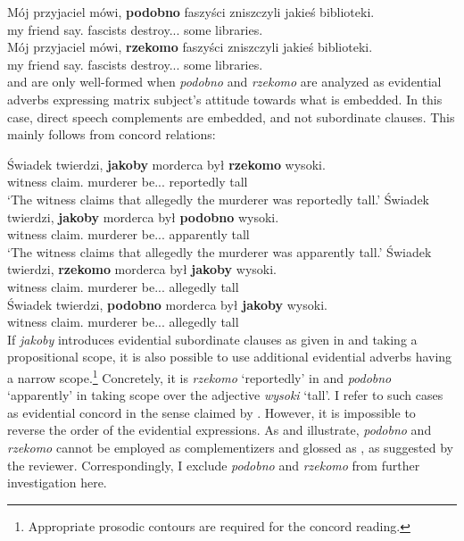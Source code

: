 \documentclass[output=paper
,modfonts
,nonflat]{langsci/langscibook}
\begin{document}
\ea \ea \gll	*Mój przyjaciel mówi, \textbf{podobno} faszyści zniszczyli jakieś biblioteki.  \label{podobno} \\
		my friend say.{\thirdperson}{\sg} {\comp}  fascists destroy.{\lptcp}.{\vir}.{\pl} some libraries. \\
	\ex\gll	*Mój przyjaciel mówi, \textbf{rzekomo} faszyści zniszczyli jakieś biblioteki. \label{rzekomo} \\
		my friend say.{\thirdperson}{\sg} {\comp}  fascists destroy.{\lptcp}.{\vir}.{\pl} some libraries. \\
          \z\z
{} and  are only well-formed when \emph{podobno} and \emph{rzekomo} are analyzed as evidential adverbs expressing matrix subject's attitude towards what is embedded. In this case, direct speech complements are embedded, and not subordinate clauses.  This mainly follows from concord relations: 

\ea \ea \gll	Świadek twierdzi, \textbf{jakoby} morderca był \textbf{rzekomo} wysoki. \label{tall1} \\
		witness claim.{\thirdperson}{\sg} {\comp} murderer be.{\lptcp}.{\thirdperson}{\sg}.{\masc} reportedly tall \\
	\glt	 `The witness claims that allegedly the murderer was reportedly tall.' 
	\ex\gll	Świadek twierdzi, \textbf{jakoby} morderca był \textbf{podobno} wysoki. \label{tall2} \\
		witness claim.{\thirdperson}{\sg} {\comp} murderer be.{\lptcp}.{\thirdperson}{\sg}.{\masc} apparently tall \\
	\glt	 `The witness claims that allegedly the murderer was apparently tall.'
	\ex\gll	*Świadek twierdzi, \textbf{rzekomo} morderca był \textbf{jakoby} wysoki. \label{tall3} \\
		witness claim.{\thirdperson}{\sg} {\comp} murderer be.{\lptcp}.{\thirdperson}{\sg}.{\masc} allegedly tall \\
	\ex\gll	*Świadek twierdzi, \textbf{podobno} morderca był \textbf{jakoby} wysoki. \label{tall4} \\
		witness claim.{\thirdperson}{\sg} {\comp} murderer be.{\lptcp}.{\thirdperson}{\sg}.{\masc} allegedly tall \\
\z\z
If \emph{jakoby} introduces evidential subordinate clauses as given in  and  taking a propositional scope, it is also possible to use additional evidential adverbs having a narrow scope.\footnote{Appropriate prosodic contours are required for the concord reading. 
}
Concretely, it is \emph{rzekomo}  `reportedly' in  and \emph{podobno} `apparently' in  taking scope over the adjective \emph{wysoki} `tall'. I refer to such cases as evidential concord in the sense claimed by \textcite{Schenner2007}. However, it is impossible to reverse the order of the evidential expressions. As  and  illustrate, \emph{podobno} and \emph{rzekomo} cannot be employed as complementizers and glossed as {\comp}, as suggested by the reviewer. Correspondingly, I exclude \emph{podobno} and \emph{rzekomo} from further investigation here. 
\end{document}
